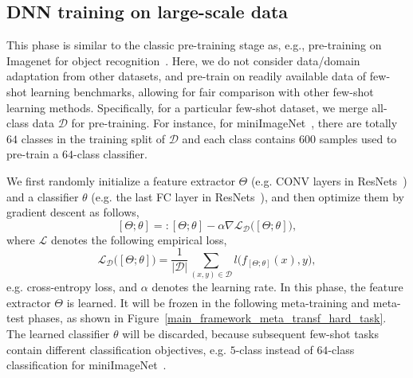 \subsection{DNN training on large-scale data}
\label{sec_large_scale_pretrain}

This phase is similar to the classic pre-training stage as, e.g., pre-training on Imagenet for object recognition~\cite{Russakovsky2015}.
%
%
Here, we do not consider data/domain adaptation from other datasets, and  pre-train on readily available data of few-shot learning benchmarks, allowing for fair comparison with other few-shot learning methods.
%
Specifically, for a particular few-shot dataset, we merge all-class data $\mathcal{D}$ for pre-training.
%
For instance, for miniImageNet~\cite{VinyalsBLKW16}, there are totally $64$ classes in the training split of $\mathcal{D}$ and each class contains $600$ samples used to pre-train a $64$-class classifier.
%

We first randomly initialize a feature extractor $\Theta$ (e.g. CONV layers in ResNets~\cite{HeZRS16}) and a classifier $\theta$ (e.g. the last FC layer in ResNets~\cite{HeZRS16}), and then optimize them by gradient descent as follows,
\begin{equation}\label{eq_large_scale_update}
 [\Theta; \theta] =: [\Theta; \theta] - \alpha\nabla\mathcal{L}_{\mathcal{D}}\big([\Theta; \theta]\big),
\end{equation}
where $\mathcal{L}$ denotes the following empirical loss,
\begin{equation}\label{eq_large_scale_loss}
    \mathcal{L}_{\mathcal{D}}\big([\Theta; \theta]\big) = \frac{1}{|\mathcal{D}|}\sum_{(x,y)\in \mathcal{D}}l\big(f_{[\Theta; \theta]}(x), y\big),
\end{equation}
e.g. cross-entropy loss, and $\alpha$ denotes the learning rate. 
%
In this phase, the feature extractor $\Theta$ is learned. It will be frozen in the following meta-training and meta-test phases, as shown in Figure~\ref{main_framework_meta_transf_hard_task}. 
%
The learned classifier $\theta$ will be discarded, because subsequent few-shot tasks contain different classification objectives, e.g. $5$-class instead of $64$-class classification for miniImageNet~\cite{VinyalsBLKW16}.